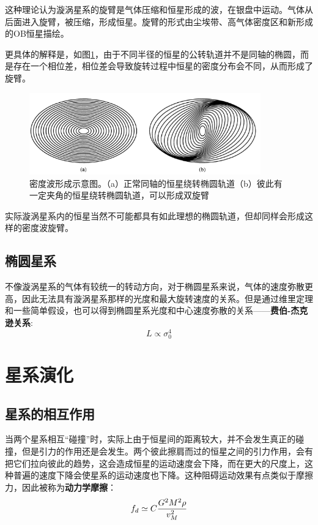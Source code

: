 \documentclass[openany]{ctexbook}
\begin{document}
这种理论认为漩涡星系的旋臂是气体压缩和恒星形成的波，在银盘中运动。气体从后面进入旋臂，被压缩，形成恒星。旋臂的形式由尘埃带、高气体密度区和新形成的OB恒星描绘。

更具体的解释是，如图\ref{fig:densitywave}，由于不同半径的恒星的公转轨道并不是同轴的椭圆，而是存在一个相位差，相位差会导致旋转过程中恒星的密度分布会不同，从而形成了旋臂。

\begin{figure}[hbt]
  \centering
  \includegraphics[width=10cm]{chapters/25/densitywave}
  \caption{密度波形成示意图。（a）正常同轴的恒星绕转椭圆轨道（b）彼此有一定夹角的恒星绕转椭圆轨道，可以形成双旋臂}
  \label{fig:densitywave}
\end{figure}

实际漩涡星系内的恒星当然不可能都具有如此理想的椭圆轨道，但却同样会形成这样的密度波旋臂。

\section{椭圆星系}
不像漩涡星系的气体有较统一的转动方向，对于椭圆星系来说，气体的速度弥散更高，因此无法具有漩涡星系那样的光度和最大旋转速度的关系。但是通过维里定理和一些简单假设，也可以得到椭圆星系光度和中心速度弥散的关系——\textbf{费伯-杰克逊关系}:
\begin{equation}
  L\propto\sigma_0^4
\end{equation}

\chapter{星系演化}
\section{星系的相互作用}
当两个星系相互``碰撞''时，实际上由于恒星间的距离较大，并不会发生真正的碰撞，但是引力的作用还是会发生。两个彼此擦肩而过的恒星之间的引力作用，会有把它们拉向彼此的趋势，这会造成恒星的运动速度会下降，而在更大的尺度上，这种普遍的速度下降会使星系的运动速度也下降。这种阻碍运动效果有点类似于摩擦力，因此被称为\textbf{动力学摩擦}：
\begin{equation}
  f_d\simeq C{G^2M^2\rho \over v_M^2}
\end{equation}
\end{document}
